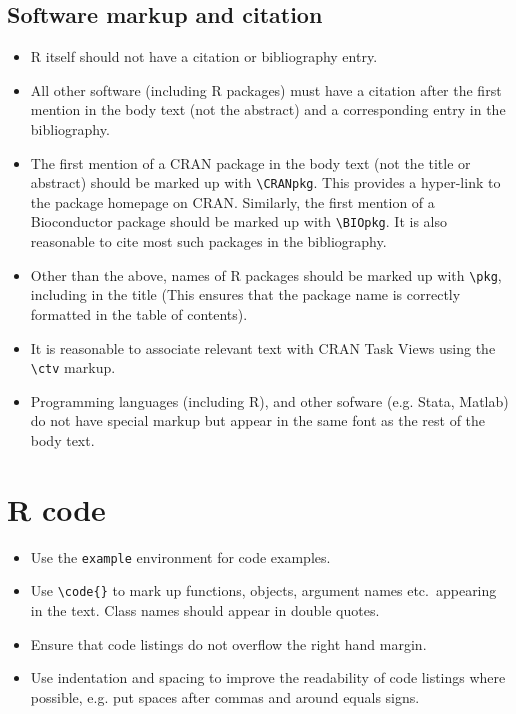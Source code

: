 \documentclass[11pt]{article}
\begin{document}
\subsection*{Software markup and citation}
\begin{itemize}
\item R itself should not have a citation or bibliography entry.
\item All other software (including R packages) must have a citation after
  the first mention in the body text (not the abstract) and a
  corresponding entry in the bibliography.
\item The first mention of a CRAN package in the body text (not the title or
  abstract) should be marked up with \verb+\CRANpkg+. This
  provides a hyper-link to the package homepage on CRAN. Similarly,
  the first mention of a Bioconductor package should be marked up with
  \verb+\BIOpkg+. It is also reasonable to cite most such packages in the
  bibliography.
\item Other than the above, names of R packages should be marked up with 
  \verb+\pkg+, including in the title (This ensures that the
  package name is correctly formatted in the table of contents).
\item It is reasonable to associate relevant text with CRAN Task Views using
  the \verb+\ctv+ markup.
\item Programming languages (including R), and other sofware
  (e.g. Stata, Matlab) do not have special markup but appear in the
  same font as the rest of the body text.
\end{itemize}

\section*{R code}

\begin{itemize}
\item Use the \verb|example| environment for code examples.
\item Use \verb+\code{}+ to mark up functions, objects, argument names etc.\
appearing in the text.  Class names should appear in double quotes.
\item Ensure that code listings do not overflow the right hand margin.
\item Use indentation and spacing to improve the readability of code
  listings where possible, e.g. put spaces after commas and around
  equals signs.
\end{itemize}
\end{document}
